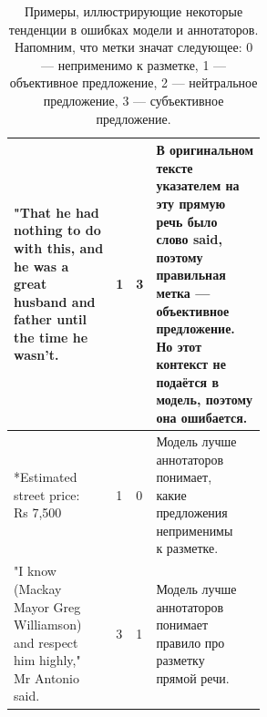 \documentclass[conference]{IEEEtran}
\begin{document}
\begin{table}[h!]
\begin{center}
\begin{tabular}{|l|l|l|l|}
            \makecell[l]{"That he had \\ nothing to do \\ with this, and \\ he was a \\ great \\ husband and \\ father until \\ the time he \\ wasn't.} & 1 & 3 & \makecell[l]{В оригинальном \\ тексте \\ указателем на \\ эту прямую \\ речь было \\ слово said, \\ поэтому \\ правильная \\ метка --- \\ объективное \\ предложение. \\ Но этот \\ контекст не \\ подаётся в \\ модель, поэтому \\ она ошибается.} \\ \hline
            \makecell[l]{*Estimated \\ street price: \\ Rs 7,500} & 1 & 0 & \makecell[l]{Модель лучше \\ аннотаторов \\ понимает, \\ какие \\ предложения \\ неприменимы \\ к разметке.} \\ \hline
            \makecell[l]{"I know \\ (Mackay \\ Mayor Greg \\ Williamson) \\ and respect \\ him highly," \\ Mr Antonio \\ said.} & 3 & 1 & \makecell[l]{Модель лучше \\ аннотаторов \\ понимает \\ правило про \\ разметку \\ прямой речи.} \\ \hline
        \end{tabular}
        \caption{Примеры, иллюстрирующие некоторые тенденции в ошибках модели и аннотаторов. Напомним, что метки значат следующее: 0 --- неприменимо к разметке, 1 --- объективное предложение, 2 --- нейтральное предложение, 3 --- субъективное предложение.}
        \label{tab:error-analysis}    
    \end{center}
\end{table}
\end{document}

